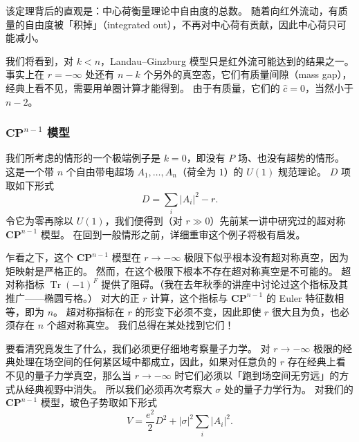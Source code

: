 
该定理背后的直观是：中心荷衡量理论中自由度的总数。
随着向红外流动，有质量的自由度被「积掉」（integrated out），不再对中心荷有贡献，因此中心荷只可能减小。

我们将看到，对 $k<n$，Landau--Ginzburg 模型只是红外流可能达到的结果之一。
事实上在 $r=-\infty$ 处还有 $n-k$ 个另外的真空态，它们有质量间隙（mass gap），经典上看不见，需要用单圈计算才能得到。
由于有质量，它们的 $\widehat{c}=0$，当然小于 $n-2$。

\subsubsection{$\mathbf{CP}^{n-1}$ 模型}

我们所考虑的情形的一个极端例子是 $k=0$，即没有 $P$ 场、也没有超势的情形。
这是一个带 $n$ 个自由带电超场 $A_1,\dots,A_n$（荷全为 $1$）的 $U(1)$ 规范理论。
$D$ 项取如下形式
\[
D=\sum_i|A_i|^2-r.
\]
令它为零再除以 $U(1)$，我们便得到（对 $r\gg0$）先前某一讲中研究过的超对称 $\mathbf{CP}^{n-1}$ 模型。
在回到一般情形之前，详细重审这个例子将极有启发。

乍看之下，这个 $\mathbf{CP}^{n-1}$ 模型在 $r\to-\infty$ 极限下似乎根本没有超对称真空，因为矩映射是严格正的。
然而，在这个极限下根本不存在超对称真空是不可能的。
超对称指标 $\operatorname{Tr}(-1)^F$ 提供了阻碍。（我在去年秋季的讲座中讨论过这个指标及其推广——椭圆亏格。）
对大的正 $r$ 计算，这个指标与 $\mathbf{CP}^{n-1}$ 的 Euler 特征数相等，即为 $n$。
超对称指标在 $r$ 的形变下必须不变，因此即使 $r$ 很大且为负，也必须存在 $n$ 个超对称真空。
我们总得在某处找到它们！

要看清究竟发生了什么，我们必须更仔细地考察量子力学。
对 $r\to-\infty$ 极限的经典处理在场空间的任何紧区域中都成立，因此，如果对任意负的 $r$ 存在经典上看不见的量子力学真空，那么当 $r\to-\infty$ 时它们必须以「跑到场空间无穷远」的方式从经典视野中消失。
所以我们必须再次考察大 $\sigma$ 处的量子力学行为。
对我们的 $\mathbf{CP}^{n-1}$ 模型，玻色子势取如下形式
\[
V=\frac{e^2}{2}D^2+|\sigma|^2\sum_i|A_i|^2.
\]

